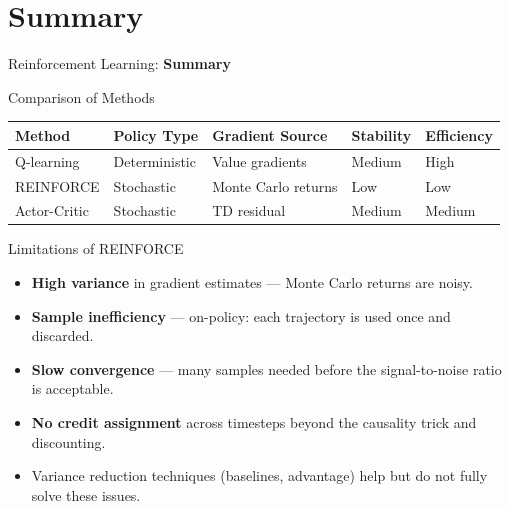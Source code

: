 \section{Summary}
\begin{frame}{}
    \LARGE Reinforcement Learning: \textbf{Summary}
\end{frame}

\begin{frame}{Comparison of Methods}
    \begin{table}[]
        \centering
        \renewcommand{\arraystretch}{1.8}
        \begin{tabular}{lllll}
            \hline
            \textbf{Method} & \textbf{Policy Type} & \textbf{Gradient Source} & \textbf{Stability} & \textbf{Efficiency} \\
            \hline
            Q-learning    & Deterministic & Value gradients         & Medium & High \\
            REINFORCE     & Stochastic    & Monte Carlo returns     & Low    & Low  \\
            Actor-Critic  & Stochastic    & TD residual     & Medium & Medium \\
            \hline
        \end{tabular}
    \end{table}
\end{frame}

\begin{frame}{Limitations of REINFORCE}
    \begin{itemize}
        \item \textbf{High variance} in gradient estimates --- Monte Carlo returns are noisy.
        \item \textbf{Sample inefficiency} --- on-policy: each trajectory is used once and discarded.
        \item \textbf{Slow convergence} --- many samples needed before the signal-to-noise ratio is acceptable.
        \item \textbf{No credit assignment} across timesteps beyond the causality trick and discounting.
        \item Variance reduction techniques (baselines, advantage) help but do not fully solve these issues.
    \end{itemize}
\end{frame}

